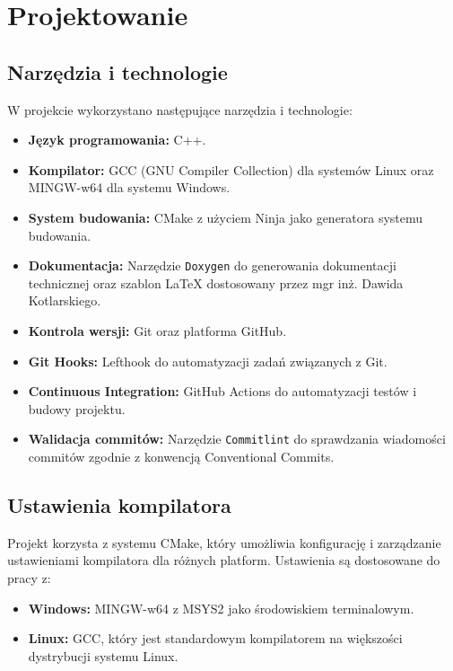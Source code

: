 \newpage
\section{Projektowanie}		%

\subsection{Narzędzia i technologie}

W projekcie wykorzystano następujące narzędzia i technologie:

\begin{itemize}
  \item \textbf{Język programowania:} C++.
  \item \textbf{Kompilator:} GCC (GNU Compiler Collection) dla systemów Linux oraz MINGW-w64 dla systemu Windows.
  \item \textbf{System budowania:} CMake z użyciem Ninja jako generatora systemu budowania.
  \item \textbf{Dokumentacja:} Narzędzie \texttt{Doxygen} do generowania dokumentacji technicznej oraz szablon \LaTeX{} dostosowany przez mgr inż. Dawida Kotlarskiego.
  \item \textbf{Kontrola wersji:} Git oraz platforma GitHub.
  \item \textbf{Git Hooks:} Lefthook do automatyzacji zadań związanych z Git.
  \item \textbf{Continuous Integration:} GitHub Actions do automatyzacji testów i budowy projektu.
  \item \textbf{Walidacja commitów:} Narzędzie \texttt{Commitlint} do sprawdzania wiadomości commitów zgodnie z konwencją Conventional Commits.
\end{itemize}

\subsection{Ustawienia kompilatora}

Projekt korzysta z systemu CMake, który umożliwia konfigurację i zarządzanie ustawieniami kompilatora dla różnych platform. Ustawienia są dostosowane do pracy z:

\begin{itemize}
  \item \textbf{Windows:} MINGW-w64 z MSYS2 jako środowiskiem terminalowym.
  \item \textbf{Linux:} GCC, który jest standardowym kompilatorem na większości dystrybucji systemu Linux.
\end{itemize}

